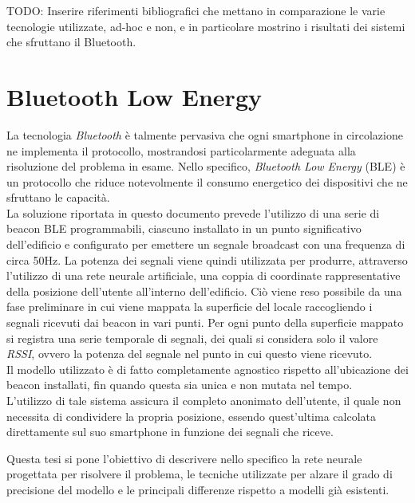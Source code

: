 \documentclass{standalone}
\begin{document}
{\LARGE TODO: Inserire riferimenti bibliografici che mettano in comparazione le
  varie tecnologie utilizzate, ad-hoc e non, e in particolare mostrino i
  risultati dei sistemi che sfruttano il Bluetooth.}

\section{Bluetooth Low Energy}
La tecnologia \emph{Bluetooth} è talmente pervasiva che
ogni smartphone in circolazione ne implementa il protocollo, mostrandosi
particolarmente adeguata alla risoluzione del problema in esame. Nello
specifico, \emph{Bluetooth Low Energy} (BLE) è un protocollo che riduce
notevolmente il consumo energetico dei dispositivi che ne sfruttano le
capacità. \\
La soluzione riportata in questo documento prevede l'utilizzo di una serie di
beacon BLE programmabili, ciascuno installato in un punto significativo
dell'edificio e configurato per emettere un segnale broadcast con una frequenza
di circa 50Hz. La potenza dei segnali viene quindi utilizzata per produrre,
attraverso l'utilizzo di una rete neurale artificiale, una coppia di coordinate
rappresentative della posizione dell'utente all'interno dell'edificio. Ciò
viene reso possibile da una fase preliminare in cui viene mappata la superficie
del locale raccogliendo i segnali ricevuti dai beacon in vari punti. Per ogni
punto della superficie mappato si registra una serie temporale di segnali, dei
quali si considera solo il valore \emph{RSSI}, ovvero la potenza del segnale
nel punto in cui questo viene ricevuto. \\
Il modello utilizzato è di fatto completamente agnostico rispetto
all'ubicazione dei beacon installati, fin quando questa sia unica e non mutata
nel tempo. \\
L'utilizzo di tale sistema assicura il completo anonimato dell'utente, il quale
non necessita di condividere la propria posizione, essendo quest'ultima
calcolata direttamente sul suo smartphone in funzione dei segnali che riceve.

Questa tesi si pone l'obiettivo di descrivere nello specifico la rete neurale
progettata per risolvere il problema, le tecniche utilizzate per alzare il
grado di precisione del modello e le principali differenze rispetto a modelli
già esistenti.
\end{document}
